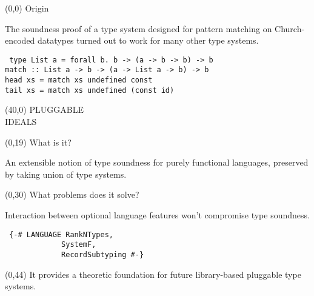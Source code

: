 \documentclass[a0]{a0poster}
\def\FONTSIZE#1{\fontsize{#1}{#1}\selectfont}
\def\HEAD#1{{\FONTSIZE{76}#1}}
\newenvironment{CODE}{\tt\FONTSIZE{36}\null}{}
\begin{document}
\raggedright
\FONTSIZE{48}

\begin{textblock}{37}(0,0)%
\HEAD{Origin}

The soundness proof of a type system designed for pattern
matching on Church-encoded datatypes turned out to work for many
other type systems.

\begin{CODE}
type List a = forall b. b -> (a -> b -> b) -> b\\
match ::~List a -> b -> (a -> List a -> b) -> b\\
head xs = match xs undefined const\\
tail xs = match xs undefined (const id)\\
\end{CODE}
\end{textblock}

\begin{textblock}{71}(40,0)
{\FONTSIZE{320}%
PLUGGABLE\\%
IDEALS
}
\end{textblock}

\begin{textblock}{34}(0,19)
\HEAD{What is it?}

An extensible notion of type soundness for purely functional
languages, preserved by taking union of type systems.
\end{textblock}

\begin{textblock}{34}(0,30)
\HEAD{What problems does it solve?}

Interaction between optional language features won't compromise
type soundness.

\begin{CODE}
\def\INDENT{~~~~~~~~~~~~~}
\{-\# LANGUAGE RankNTypes,\\
\INDENT SystemF,\\
\INDENT RecordSubtyping \#-\}\\
\end{CODE}
\end{textblock}

\begin{textblock}{30}(0,44)
It provides a theoretic foundation for future library-based
pluggable type systems.
\end{textblock}
\end{document}

